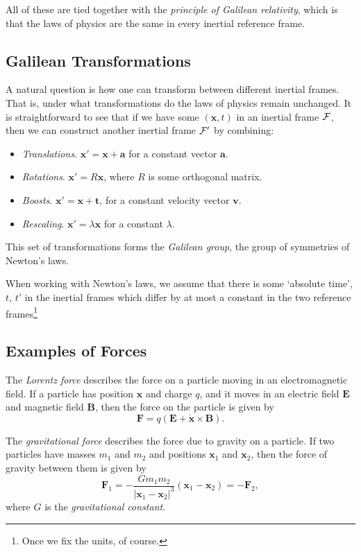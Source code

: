\documentclass{scrartcl}
\newcommand{\vv}[1]{\boldsymbol{\mathbf{#1}}}
\theoremstyle{definition}
\newcommand{\vocab}[1]{\emph{#1}}
\begin{document}
All of these are tied together with the \emph{principle of Galilean relativity}, which is that the laws of physics are the same in every inertial reference frame.

\subsection*{Galilean Transformations}

A natural question is how one can transform between different inertial frames. That is, under what transformations do the laws of physics remain unchanged. It is straightforward to see that if we have some $(\vv x, t)$ in an inertial frame $\mathcal{F}$, then we can construct another inertial frame $\mathcal{F}'$ by combining:
\begin{itemize}
	\item \emph{Translations}. $\vv x' = \vv x + \vv a$ for a constant vector $\vv a$.
	\item \emph{Rotations}. $\vv x' = R \vv x$, where $R$ is some orthogonal matrix.
	\item \emph{Boosts}. $\vv x' = \vv x + \vv t$, for a constant velocity vector $\vv v$.
	\item \emph{Rescaling}. $\vv x' = \lambda \vv x$ for a constant $\lambda$. 
\end{itemize}
This set of transformations forms the \emph{Galilean group}, the group of symmetries of Newton's laws.

When working with Newton's laws, we assume that there is some `absolute time', $t$, $t'$ in the inertial frames which differ by at most a constant in the two reference frames\footnote{Once we fix the units, of course.}

\subsection*{Examples of Forces}

The \emph{Lorentz force} describes the force on a particle moving in an electromagnetic field. If a particle has position $\vv x$ and charge $q$, and it moves in an electric field $\vv E$ and magnetic field $\vv B$, then the force on the particle is given by
$$
\vv F = q(\vv E + \dot{\vv x} \times \vv B).
$$


The \emph{gravitational force} describes the force due to gravity on a particle. If two particles have masses $m_1$ and $m_2$ and positions $\vv x_1$ and $\vv x_2$, then the force of gravity between them is given by
$$
\vv F_1 = - \frac{G m_1 m_2}{| \vv x_1 - \vv x_2|^3} (\vv x_1 - \vv x_2) = - \vv F_2,
$$
where $G$ is the \vocab{gravitational constant}.
\end{document}
